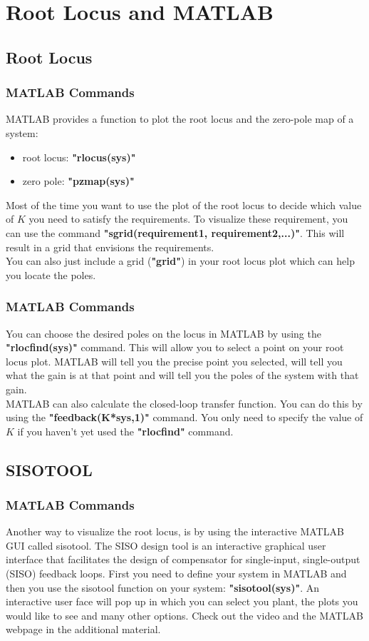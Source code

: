\section{Root Locus and MATLAB}

\subsection{Root Locus}

\begin{frame}
\frametitle{MATLAB Commands}
	MATLAB provides a function to plot the root locus and the zero-pole map of a system:
	\begin{itemize}
		\item root locus: \textbf{"rlocus(sys)"}
		\item zero pole: \textbf{"pzmap(sys)"}
	\end{itemize} 
	\vspace{1em}
	Most of the time you want to use the plot of the root locus to decide which value of $K$ you need to satisfy the requirements. To visualize these requirement, you can use the command \textbf{"sgrid(requirement1, requirement2,...)"}. This will result in a grid that envisions the requirements.\\
	\vspace{1em}
	You can also just include a grid (\textbf{"grid"}) in your root locus plot which can help you locate the poles.
\end{frame}

\begin{frame}
\frametitle{MATLAB Commands}
	You can choose the desired poles on the locus in MATLAB by using the \textbf{"rlocfind(sys)"} command. This will allow you to select a point on your root locus plot. MATLAB will tell you the precise point you selected, will tell you what the gain is at that point and will tell you the poles of the system with that gain.\\
	\vspace{1em}
	MATLAB can also calculate the closed-loop transfer function. You can do this by using the \textbf{"feedback(K*sys,1)"} command. You only need to specify the value of $K$ if you haven't yet used the \textbf{"rlocfind"} command.
\end{frame}

\subsection{SISOTOOL}

\begin{frame}
\frametitle{MATLAB Commands}
	Another way to visualize the root locus, is by using the interactive MATLAB GUI called sisotool. The SISO design tool is an interactive graphical user interface that facilitates the design of compensator for single-input, single-output (SISO) feedback loops.
	\vspace{1em}
	First you need to define your system in MATLAB and then you use the sisotool function on your system: \textbf{"sisotool(sys)"}. An interactive user face will pop up in which you can select you plant, the plots you would like to see and many other options. Check out the video and the MATLAB webpage in the additional material.	
\end{frame}